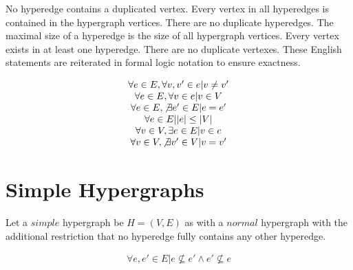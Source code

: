  No hyperedge contains a duplicated vertex. Every vertex in all hyperedges is contained in the hypergraph vertices. There are no duplicate hyperedges. The maximal size of a hyperedge is the size of all hypergraph vertices. Every vertex exists in at least one hyperedge. There are no duplicate vertexes. These English statements are reiterated in formal logic notation to ensure exactness. 


\begin{equation*}
\begin{matrix}
\forall e \in E , \forall v, v' \in e \vert v \ne v'\\
\forall e \in E , \forall v \in e \vert v \in V\\
\forall e \in E , \not\exists e' \in E \vert e = e'\\
\forall e \in E \vert |e| \le |V|\\
\forall v \in V , \exists e \in E \vert v \in e\\
\forall v \in V , \not\exists v' \in V \vert v = v'\\
\end{matrix}
\end{equation*}

\section{Simple Hypergraphs}
\begin{definition}
Let a $simple$ hypergraph be $H=(V,E)$ as with a $normal$ hypergraph with the additional restriction that no hyperedge fully contains any other hyperedge.
\end{definition}
\begin{equation*}
\begin{matrix}
\forall e , e' \in E \vert e \not \subseteq e' \wedge e' \not \subseteq e\\
\end{matrix}
\end{equation*}